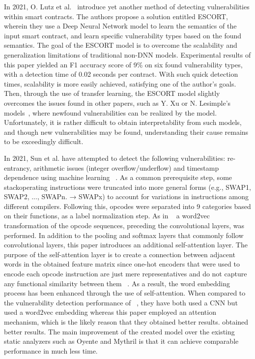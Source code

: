 In 2021, O. Lutz et al.~\cite{dolan2016lava} introduce yet another method of detecting vulnerabilities within smart contracts.
The authors propose a solution entitled ESCORT, wherein they use a Deep Neural Network model to learn the semantics of the input smart contract, and learn specific vulnerability types based on the found semantics.
The goal of the ESCORT model is to overcome the scalability and generalization limitations of traditional non-DNN models.
Experimental results of this paper yielded an F1 accuracy score of 9\% on six found vulnerability types, with a detection time of 0.02 seconds per contract.
With such quick detection times, scalability is more easily achieved, satisfying one of the author's goals.
Then, through the use of transfer learning, the ESCORT model slightly overcomes the issues found in other papers, such as Y. Xu or N. Lesimple's models~\cite{grech2019gigahorse}, where newfound vulnerabilities can be realized by the model.
Unfortunately, it is rather difficult to obtain interpretability from such models, and though new vulnerabilities may be found, understanding their cause remains to be exceedingly difficult.

In 2021, Sun et al. have attempted to detect the following vulnerabilities: re-entrancy, arithmetic issues (integer overflow/underflow) and timestamp dependence using machine learning ~\cite{grech2019gigahorse}.
As a common prerequisite step, some stackoperating instructions were truncated into more general forms (e.g., SWAP1, SWAP2, ..., SWAPn. → SWAPx) to account for variations in instructions among different compilers.
Following this, opcodes were separated into 9 categories based on their functions, as a label normalization step.
As in ~\cite{etehrTrust} a word2vec transformation of the opcode sequences, preceding the convolutional layers, was performed.
In addition to the pooling and softmax layers that commonly follow convolutional layers, this paper introduces an additional self-attention layer.
The purpose of the self-attention layer is to create a connection between adjacent words in the obtained feature matrix since one-hot encoders that were used to encode each opcode instruction are just mere representatives and do not capture any functional similarity between them ~\cite{grech2019gigahorse}.
As a result, the word embedding process has been enhanced through the use of self-attention.
When compared to the vulnerability detection performance of ~\cite{etehrTrust}, they have both used a CNN but ~\cite{etehrTrust} used a word2vec embedding whereas this paper employed an attention mechanism, which is the likely reason that they obtained better results.
obtained better results. The main improvement of the created model over the existing static analyzers such as Oyente and Mythril is that it can achieve comparable performance in much less time.

